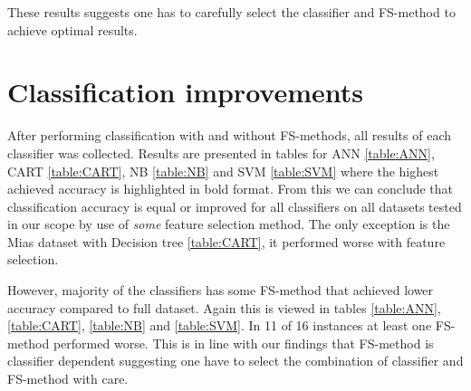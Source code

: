 

These results suggests one has to carefully select the classifier and FS-method to achieve optimal results.


\section{Classification improvements}

After performing classification with and without FS-methods, all results of each classifier was collected. Results are presented in tables for ANN \ref{table:ANN}, CART \ref{table:CART}, NB \ref{table:NB} and SVM \ref{table:SVM} where the highest achieved accuracy is highlighted in bold format. From this we can conclude that classification accuracy is equal or improved for all classifiers on all datasets tested in our scope by use of \textit{some} feature selection method. The only exception is the Mias dataset with Decision tree \ref{table:CART}, it performed worse with feature selection.

However, majority of the classifiers has some FS-method that achieved lower accuracy compared to full dataset. Again this is viewed in tables \ref{table:ANN}, \ref{table:CART}, \ref{table:NB} and \ref{table:SVM}. In 11 of 16 instances at least one FS-method performed worse. This is in line with our findings that FS-method is classifier dependent suggesting one have to select the combination of classifier and FS-method with care.

\begin{table}[h]
  \centering
  
  \caption[]%
  {{\small Classification accuracy achieved by ANN. Accuracy improved on all datasets by the use of some feature selection method. Rows represent feature selection method, columns represent dataset, bold font indicates the highest value.}}
  \label{table:ANN}
\end{table}

\begin{table}[h]
  \centering
   \\
  \caption[]%
  {{\small All datasets except MIAS benefited in classification accuracy from feature selection using CART Decision Tree classifier. Rows represent feature selection method, columns represent dataset, bold font indicates the highest value.}}
  \label{table:CART}
\end{table}

\begin{table}[h]
  \centering
   \\
  \caption[]%
  {{\small Na\"ive Bayes sees improvement or equivalent accuracy by feature selection on every dataset. Rows represent feature selection method, columns represent dataset, bold font indicates the highest value.}}
  \label{table:NB}
\end{table}

